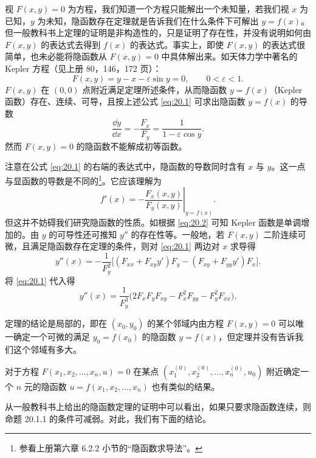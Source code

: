 \begin{xremark}
视 $F(x,y)=0$ 为方程，我们知道一个方程只能解出一个未知量，若我们视 $x$ 为已知，$y$ 为未知，隐函数存在定理就是告诉我们在什么条件下可解出 $y=f(x)$。但一般教科书上定理的证明是非构造性的，只是证明了存在性，并没有说明如何由 $F(x,y)$ 的表达式去得到 $f(x)$ 的表达式。事实上，即使 $F(x,y)$ 的表达式很简单，也未必能将隐函数从 $F(x,y)=0$ 中具体解出来。如天体力学中著名的 Kepler 方程（见上册 80，146，172 页）：
\[
  F(x,y)=y-x-\varepsilon\sin y=0,\qquad 0<\varepsilon<1.
\]
$F(x,y)$ 在 $(0,0)$ 点附近满足定理所述条件，从而隐函数 $y=f(x)$（Kepler 函数）存在、连续、可导，且按上述公式 \eqref{eq:20.1} 可求出隐函数 $y=f(x)$ 的导数
\begin{equation}
  \frac{\dd y}{\dd x}=-\frac{F_x}{F_y}=\frac{1}{1-\varepsilon\cos y}.
  \tag{20.2}
  \label{eq:20.2}
\end{equation}
然而 $F(x,y)=0$ 的隐函数不能解成初等函数。

注意在公式 \eqref{eq:20.1} 的右端的表达式中，隐函数的导数同时含有 $x$ 与 $y$。这一点与显函数的导数是不同的\footnote{参看上册第六章 6.2.2 小节的“隐函数求导法”。}。它应该理解为
\[
  f'(x)=-\left.\frac{F_x(x,y)}{F_y(x,y)}\right|_{y=f(x)}.
\]
但这并不妨碍我们研究隐函数的性质。如根据 \eqref{eq:20.2} 可知 Kepler 函数是单调增加的。由 $y$ 的可导性还可推知 $y''$ 的存在性等。一般地，若 $F(x,y)$ 二阶连续可微，且满足隐函数存在定理的条件，则对 \eqref{eq:20.1} 两边对 $x$ 求导得
\[
  y''(x)=-\frac{1}{F_y^2}\bigl[(F_{xx}+F_{xy}y')F_y-(F_{xy}+F_{yy}y')F_x\bigr].
\]
将 \eqref{eq:20.1} 代入得
\[
  y''(x)=\frac{1}{F_y^3}\bigl(2F_xF_yF_{xy}-F_x^2F_{yy}-F_y^2F_{xx}\bigr).
\]
\end{xremark}

\begin{xremark}
定理的结论是局部的，即在 $(x_0,y_0)$ 的某个邻域内由方程 $F(x,y)=0$ 可以唯一确定一个可微的满足 $y_0=f(x_0)$ 的隐函数 $y=f(x)$，但定理并没有告诉我们这个邻域有多大。
\end{xremark}

\begin{xremark}
对于方程 $F(x_1,x_2,\ldots,x_n,u)=0$ 在某点 $(x_1^{(0)},x_2^{(0)},\ldots,x_n^{(0)},u_0)$ 附近确定一个 $n$ 元的隐函数 $u=f(x_1,x_2,\ldots,x_n)$ 也有类似的结果。
\end{xremark}

\begin{xremark}
从一般教科书上给出的隐函数定理的证明中可以看出，如果只要求隐函数连续，则命题 20.1.1 的条件可减弱。对此，我们有下面的结论。
\end{xremark}

